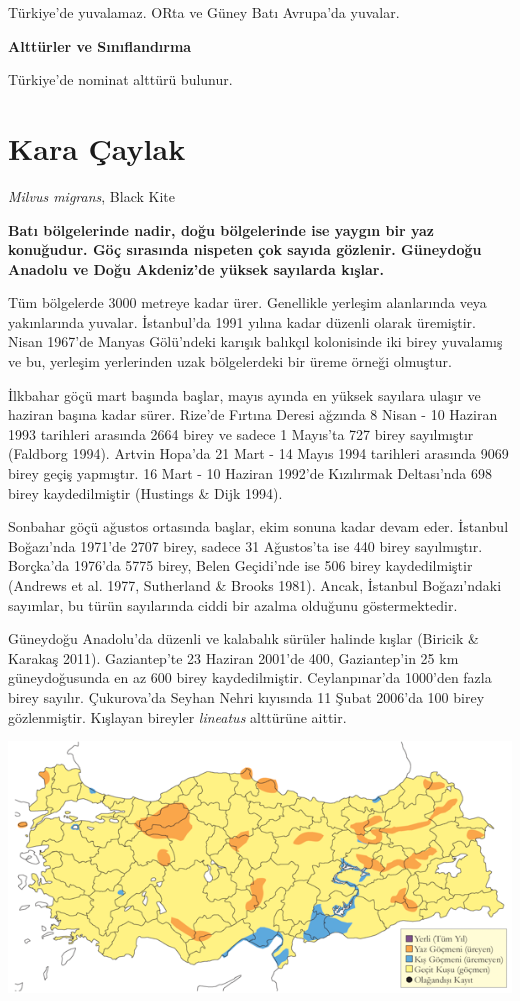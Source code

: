 \documentclass[
  letterpaper,
  DIV=11,
  numbers=noendperiod]{scrreprt}
\begin{document}
Türkiye'de yuvalamaz. ORta ve Güney Batı Avrupa'da yuvalar.

\textbf{Alttürler ve Sınıflandırma}

Türkiye'de nominat alttürü bulunur.

\section{Kara Çaylak}\label{kara-uxe7aylak}

\emph{Milvus migrans}, Black Kite

\textbf{Batı bölgelerinde nadir, doğu bölgelerinde ise yaygın bir yaz
konuğudur. Göç sırasında nispeten çok sayıda gözlenir. Güneydoğu Anadolu
ve Doğu Akdeniz'de yüksek sayılarda kışlar.}

Tüm bölgelerde 3000 metreye kadar ürer. Genellikle yerleşim alanlarında
veya yakınlarında yuvalar. İstanbul'da 1991 yılına kadar düzenli olarak
üremiştir. Nisan 1967'de Manyas Gölü'ndeki karışık balıkçıl kolonisinde
iki birey yuvalamış ve bu, yerleşim yerlerinden uzak bölgelerdeki bir
üreme örneği olmuştur.

İlkbahar göçü mart başında başlar, mayıs ayında en yüksek sayılara
ulaşır ve haziran başına kadar sürer. Rize'de Fırtına Deresi ağzında 8
Nisan - 10 Haziran 1993 tarihleri arasında 2664 birey ve sadece 1
Mayıs'ta 727 birey sayılmıştır (Faldborg 1994). Artvin Hopa'da 21 Mart -
14 Mayıs 1994 tarihleri arasında 9069 birey geçiş yapmıştır. 16 Mart -
10 Haziran 1992'de Kızılırmak Deltası'nda 698 birey kaydedilmiştir
(Hustings \& Dijk 1994).

Sonbahar göçü ağustos ortasında başlar, ekim sonuna kadar devam eder.
İstanbul Boğazı'nda 1971'de 2707 birey, sadece 31 Ağustos'ta ise 440
birey sayılmıştır. Borçka'da 1976'da 5775 birey, Belen Geçidi'nde ise
506 birey kaydedilmiştir (Andrews et al. 1977, Sutherland \& Brooks
1981). Ancak, İstanbul Boğazı'ndaki sayımlar, bu türün sayılarında ciddi
bir azalma olduğunu göstermektedir.

Güneydoğu Anadolu'da düzenli ve kalabalık sürüler halinde kışlar
(Biricik \& Karakaş 2011). Gaziantep'te 23 Haziran 2001'de 400,
Gaziantep'in 25 km güneydoğusunda en az 600 birey kaydedilmiştir.
Ceylanpınar'da 1000'den fazla birey sayılır. Çukurova'da Seyhan Nehri
kıyısında 11 Şubat 2006'da 100 birey gözlenmiştir. Kışlayan bireyler
\emph{lineatus} alttürüne aittir.

\includegraphics{images/harita_Page_107.png}
\end{document}
